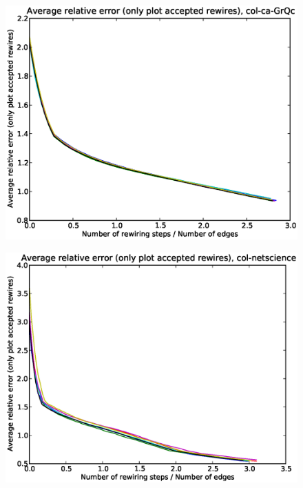 \documentclass[12pt]{article}
\begin{document}
\begin{figure}[p]
\includegraphics[scale=0.75]{acceptedOnly-col-ca-GrQc.eps}\\
\end{figure}


\begin{figure}[p]
\includegraphics[scale=0.75]{acceptedOnly-col-netscience.eps}\\
\end{figure}
\end{document}

